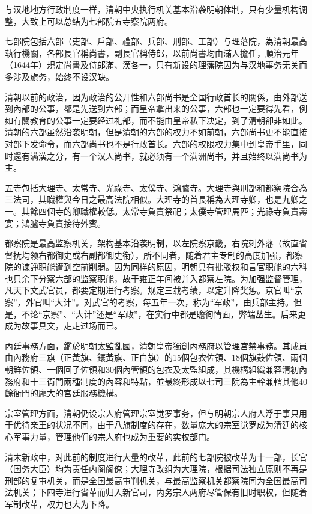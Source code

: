 与汉地地方行政制度一样，清朝中央执行机关基本沿袭明朝体制，只有少量机构调整，大致上可以总结为七部院五寺察院两府。

七部院包括六部（吏部、戶部、禮部、兵部、刑部、工部）与理藩院，為清朝最高執行機關，各部長官稱尚書，副長官稱侍郎，以前尚書均由滿人擔任，順治元年（1644年）規定尚書及侍郎滿、漢各一，只有新设的理藩院因为与汉地事务无关而多涉及旗务，始终不设汉缺。

清朝以前的政治，因为政治的公开性和六部尚书是全国行政首长的關係，由外部送到內部的公事，都是先送到六部；而皇帝拿出来的公事，六部也一定要得先看，例如有關教育的公事一定要经过礼部，而不能由皇帝私下决定，到了清朝卻非如此。清朝的六部虽然沿袭明朝，但是清朝的六部的权力不如前朝，六部尚书更不能直接对部下发命令，而六部尚书也不是行政首长。六部的权限权力集中到皇帝手里，同时還有满漢之分，有一个汉人尚书，就必须有一个满洲尚书，并且始终以满尚书为主。

五寺包括大理寺、太常寺、光祿寺、太僕寺、鴻臚寺。大理寺與刑部和都察院合為三法司，其職權與今日之最高法院相似。大理寺的首長稱為大理寺卿，也是九卿之一。其餘四個寺的卿職權較低。太常寺負責祭祀；太僕寺管理馬匹；光祿寺負責壽宴；鴻臚寺負責接待外賓。

都察院是最高监察机关，架构基本沿袭明制，以左院察京畿，右院刺外藩（故直省督抚均领右都御史或右副都御史衔），所不同者，随着君主专制的高度加强，都察院的谏諍职能遭到空前削弱。因为同样的原因，明朝具有批驳权和言官职能的六科也只余下分察六部的监察职能，故于雍正年间被并入都察左院。为加强监督管理，凡天下文武官员，都要定期进行考察。规定三载考绩，以定升降奖惩。京官叫“京察”，外官叫“大计”。对武官的考察，每五年一次，称为“军政”，由兵部主持。但是，不论“京察”、“大计”还是“军政”，在实行中都是瞻徇情面，弊端丛生。后来更成为故事具文，走走过场而已。

內廷事務方面，鑑於明朝太監亂國，清朝皇帝獨創內務府以管理宮禁事務。其成員由內務府三旗（正黃旗、鑲黃旗、正白旗）的15個包衣佐領、18個旗鼓佐領、兩個朝鮮佐領、一個回子佐領和30個內管領的包衣及太監組成，其機構組織兼容清初內務府和十三衙門兩種制度的內容和特點，並最終形成以七司三院為主幹兼轄其他40餘衙門的龐大的宮廷服務機構。

宗室管理方面，清朝仍设宗人府管理宗室觉罗事务，但与明朝宗人府人浮于事只用于优待亲王的状况不同，由于八旗制度的存在，数量庞大的宗室觉罗成为清廷的核心军事力量，管理他们的宗人府也成为重要的实权部门。

清末新政中，对此前的制度进行大量的改革，此前的七部院被改革为十一部，长官（国务大臣）均为责任内阁阁僚；大理寺改组为大理院，根据司法独立原则不再是刑部的复审机关，而是全国最高审判机关，与最高监察机关都察院同为全国最高司法机关；下四寺进行省革而归入新官司，内务宗人两府尽管保有旧时职权，但随着军制改革，权力也大为下降。

